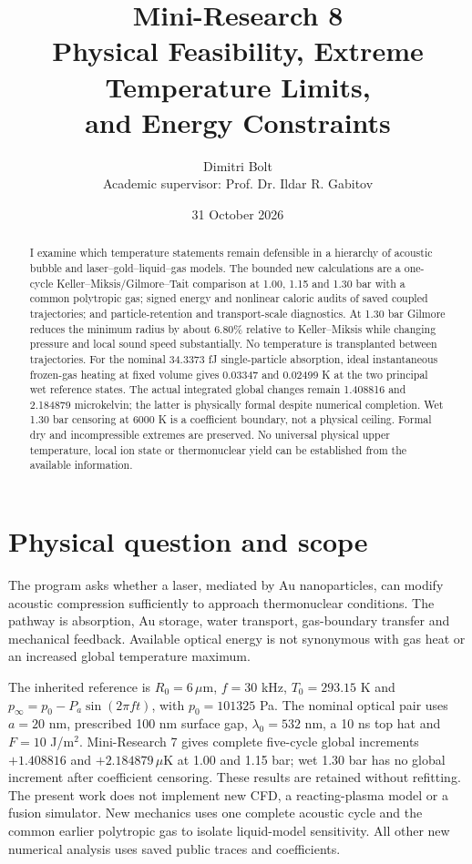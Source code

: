 \documentclass[10pt,a4paper]{article}
\title{\textbf{Mini-Research 8}\\Physical Feasibility, Extreme Temperature Limits,\\and Energy Constraints}
\author{Dimitri Bolt\\\small Academic supervisor: Prof. Dr. Ildar R. Gabitov}
\date{31 October 2026}
\begin{document}
\maketitle\vspace{-1em}
\begin{abstract}
I examine which temperature statements remain defensible in a hierarchy of acoustic bubble and laser--gold--liquid--gas models. The bounded new calculations are a one-cycle Keller--Miksis/Gilmore--Tait comparison at 1.00, 1.15 and 1.30 bar with a common polytropic gas; signed energy and nonlinear caloric audits of saved coupled trajectories; and particle-retention and transport-scale diagnostics. At 1.30 bar Gilmore reduces the minimum radius by about 6.80\% relative to Keller--Miksis while changing pressure and local sound speed substantially. No temperature is transplanted between trajectories. For the nominal 34.3373 fJ single-particle absorption, ideal instantaneous frozen-gas heating at fixed volume gives 0.03347 and 0.02499 K at the two principal wet reference states. The actual integrated global changes remain 1.408816 and 2.184879 microkelvin; the latter is physically formal despite numerical completion. Wet 1.30 bar censoring at 6000 K is a coefficient boundary, not a physical ceiling. Formal dry and incompressible extremes are preserved. No universal physical upper temperature, local ion state or thermonuclear yield can be established from the available information.
\end{abstract}
\section{Physical question and scope}
The program asks whether a laser, mediated by Au nanoparticles, can modify acoustic compression sufficiently to approach thermonuclear conditions. The pathway is absorption, Au storage, water transport, gas-boundary transfer and mechanical feedback. Available optical energy is not synonymous with gas heat or an increased global temperature maximum.

The inherited reference is $R_0=6\,\mu$m, $f=30$ kHz, $T_0=293.15$ K and $p_\infty=p_0-P_a\sin(2\pi ft)$, with $p_0=101325$ Pa. The nominal optical pair uses $a=20$ nm, prescribed 100 nm surface gap, $\lambda_0=532$ nm, a 10 ns top hat and $F=10$ J/m$^2$. Mini-Research 7 gives complete five-cycle global increments $+1.408816$ and $+2.184879\,\mu$K at 1.00 and 1.15 bar; wet 1.30 bar has no global increment after coefficient censoring.
These results are retained without refitting. The present work does not implement new CFD, a reacting-plasma model or a fusion simulator. New mechanics uses one complete acoustic cycle and the common earlier polytropic gas to isolate liquid-model sensitivity. All other new numerical analysis uses saved public traces and coefficients.
\end{document}
